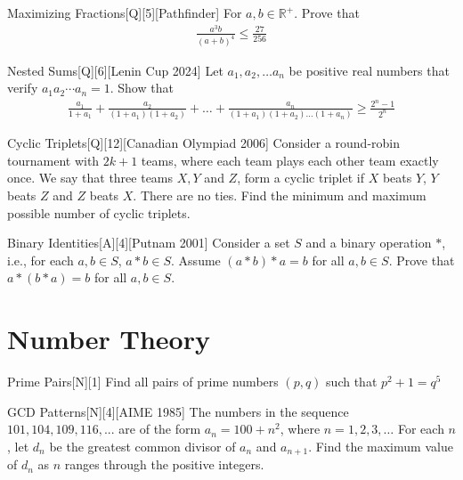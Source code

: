 \begin{problem}{Maximizing Fractions}[Q][5][Pathfinder]
    For $a,b \in \mathbb{R}^+$. Prove that 
    \begin{align*}
        \frac{a^3b}{(a+b)^4} \leq \frac{27}{256}
    \end{align*}
\end{problem}

\begin{problem}{Nested Sums}[Q][6][Lenin Cup 2024]
    Let $a_1,a_2,\ldots a_n$ be positive real numbers that verify $a_1a_2 \cdots a_n=1$. Show that 
    \begin{align*}
        \frac{a_1}{1+a_1}+\frac{a_2}{(1+a_1)(1+a_2)}+\ldots+\frac{a_n}{(1+a_1)(1+a_2) \ldots (1+a_n)} \geq \frac{2^n-1}{2^n}
    \end{align*}
\end{problem}

\begin{problem}{Cyclic Triplets}[Q][12][Canadian Olympiad 2006]
    Consider a round-robin tournament with $2k + 1$ teams, where each team plays each other team exactly once. We say that three teams $X, Y$ and $Z$, form a cyclic triplet if $X$ beats $Y$, $Y$ beats $Z$ and $Z$ beats $X$. There are no ties. Find the minimum and maximum possible number of cyclic triplets.
\end{problem}

\begin{problem}{Binary Identities}[A][4][Putnam 2001]
    Consider a set $S$ and a binary operation $*$, i.e., for each $a,b \in S$, $a*b \in S$. Assume $(a*b)*a = b$ for all $a,b \in S$. Prove that $a * (b * a) = b$ for all $a,b \in S$.
\end{problem}

\section{Number Theory}

\begin{problem}{Prime Pairs}[N][1]
    Find all pairs of prime numbers $(p,q)$ such that $p^2+1=q^5$
\end{problem}

\begin{problem}{GCD Patterns}[N][4][AIME 1985]
    The numbers in the sequence $101, 104, 109,116, . . .$ are of the form $a_n = 100+n^2$, where $n = 1,2,3,\ldots$ For each $n$, let $d_n$ be the greatest common divisor of $a_n$ and $a_{n+1}$. Find the maximum value of $d_n$ as $n$ ranges through the positive integers.
\end{problem}

